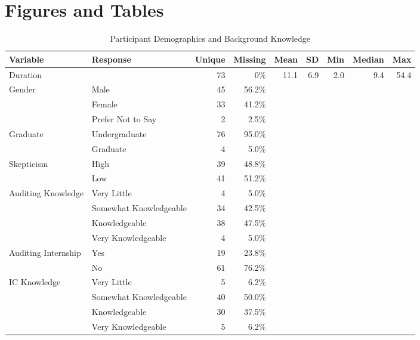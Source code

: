 \documentclass[12pt,english]{article}
\begin{document}
\section*{Figures and Tables}\label{sec:figTables}

\begin{table}[ht]
\centering
\caption{Participant Demographics and Background Knowledge}
\begin{tabularx}{\textwidth}{l l r r r r r r r}
\toprule
Variable & Response & Unique & Missing & Mean & SD & Min & Median & Max \\
\midrule
Duration & & 73 & 0\% & 11.1 & 6.9 & 2.0 & 9.4 & 54.4 \\
\addlinespace
Gender & Male & 45 & 56.2\% & & & & & \\
& Female & 33 & 41.2\% & & & & & \\
& Prefer Not to Say & 2 & 2.5\% & & & & & \\
\addlinespace
Graduate & Undergraduate & 76 & 95.0\% & & & & & \\
& Graduate & 4 & 5.0\% & & & & & \\
\addlinespace
Skepticism & High & 39 & 48.8\% & & & & & \\
& Low & 41 & 51.2\% & & & & & \\
\addlinespace
Auditing Knowledge & Very Little & 4 & 5.0\% & & & & & \\
& Somewhat Knowledgeable & 34 & 42.5\% & & & & & \\
& Knowledgeable & 38 & 47.5\% & & & & & \\
& Very Knowledgeable & 4 & 5.0\% & & & & & \\
\addlinespace
Auditing Internship & Yes & 19 & 23.8\% & & & & & \\
& No & 61 & 76.2\% & & & & & \\
\addlinespace
IC Knowledge & Very Little & 5 & 6.2\% & & & & & \\
& Somewhat Knowledgeable & 40 & 50.0\% & & & & & \\
& Knowledgeable & 30 & 37.5\% & & & & & \\
& Very Knowledgeable & 5 & 6.2\% & & & & & \\
\bottomrule
\end{tabularx}
\end{table}
\end{document}
